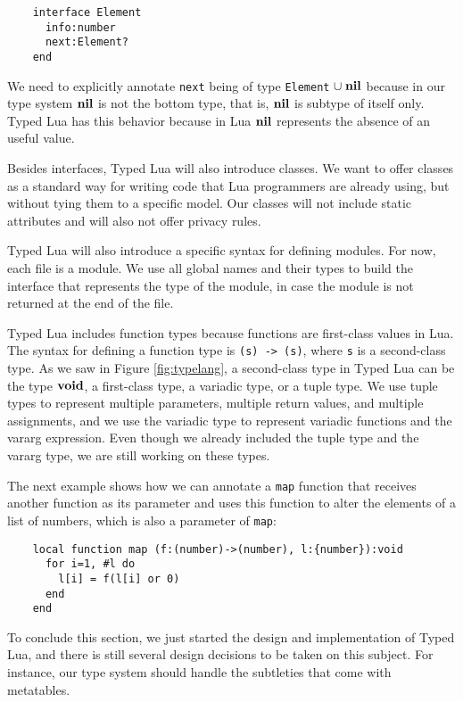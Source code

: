\begin{verbatim}
    interface Element
      info:number
      next:Element?
    end
\end{verbatim}

We need to explicitly annotate \texttt{next} being of type
\texttt{Element}$\;\cup\;\mathbf{nil}$ because in our type system $\mathbf{nil}$
is not the bottom type, that is, $\mathbf{nil}$ is subtype of itself only.
Typed Lua has this behavior because in Lua $\mathbf{nil}$ represents
the absence of an useful value.

Besides interfaces, Typed Lua will also introduce classes.
We want to offer classes as a standard way for writing code that
Lua programmers are already using, but without tying them to a
specific model.
Our classes will not include static attributes and will also not offer
privacy rules.

Typed Lua will also introduce a specific syntax for defining modules.
For now, each file is a module.
We use all global names and their types to build the interface that
represents the type of the module, in case the module is not returned
at the end of the file.

Typed Lua includes function types because functions are first-class
values in Lua.
The syntax for defining a function type is \texttt{(s) -> (s)},
where \texttt{s} is a second-class type.
As we saw in Figure \ref{fig:typelang}, a second-class type in
Typed Lua can be the type $\mathbf{void}$, a first-class type, a variadic
type, or a tuple type.
We use tuple types to represent multiple parameters, multiple return
values, and multiple assignments, and we use the variadic type to
represent variadic functions and the vararg expression.
Even though we already included the tuple type and the vararg type,
we are still working on these types.

The next example shows how we can annotate a \texttt{map} function
that receives another function as its parameter and uses this
function to alter the elements of a list of numbers, which is
also a parameter of \texttt{map}:
\begin{verbatim}
    local function map (f:(number)->(number), l:{number}):void
      for i=1, #l do
        l[i] = f(l[i] or 0)
      end
    end
\end{verbatim}

To conclude this section, we just started the design and
implementation of Typed Lua, and there is still several design
decisions to be taken on this subject.
For instance, our type system should handle the subtleties that
come with metatables.

